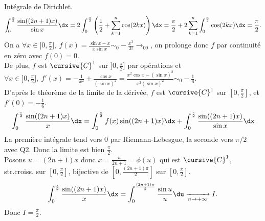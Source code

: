 \documentclass[11pt]{article}
\begin{document}
\begin{ex}{Intégrale de Dirichlet.}{}
\begin{equation*}
        \int_0^{\frac{\pi}{2}}\frac{\sin((2n+1)x)}{\sin x}\dx = 2\int_0^\frac{\pi}{2}\left( \frac{1}{2} + \sum_{k=1}^n \cos(2kx) \right) \dx = \frac{\pi}{2} + 2\sum_{k=1}^n\int_0^{\frac{\pi}{2}}\cos(2kx)\dx=\frac{\pi}{2}.
    \end{equation*}
     On a $\forall x \in ]0,\frac{\pi}{2}], ~ f(x)=\frac{\sin x - x}{x\sin x}\sim_0-\frac{x^3}{3!}\to_00$, on prolonge donc $f$ par continuité en zéro avec $f(0)=0$.\\
    De plus, $f$ est $\cursive{C}^1$ sur $]0,\frac{\pi}{2}]$ par opérations et $\forall x \in ]0,\frac{\pi}{2}], ~ f'(x)=-\frac{1}{x^2}+\frac{\cos x}{(\sin x)^2}=\frac{x^2\cos x - (\sin x)^2}{x^2(\sin x)^2} \sim_0 -\frac{1}{6}$.\\
    D'après le théorème de la limite de la dérivée, $f$ est $\cursive{C}^1$ sur $[0,\frac{\pi}{2}]$, et $f'(0)=-\frac{1}{6}$.\\
    \begin{equation*}
        \int_0^{\frac{\pi}{2}}\frac{\sin((2n+1)x)}{x}\dx = \int_0^{\frac{\pi}{2}}f(x)\sin((2n+1)x)\dx + \int_0^{\frac{\pi}{2}}\frac{\sin((2n+1)x)}{\sin x}\dx 
    \end{equation*}
    La première intégrale tend vers 0 par Riemann-Lebesgue, la seconde vers $\pi/2$ avec Q2. Donc la limite est bien $\frac{\pi}{2}$.\\
    Posons $u=(2n+1)x$ donc $x=\frac{u}{2n+1}=\phi(u)$ qui est $\cursive{C}^1$, str.croiss. sur $[0,\frac{\pi}{2}]$, bijective de $[0,\frac{(2n+1)\pi}{2}]$ sur $[0,\frac{\pi}{2}]$.
    \begin{equation*}
        \int_0^\frac{\pi}{2}\frac{\sin((2n+1)x)}{x}\dx = \int_0^{\frac{(2n+1)\pi}{2}}\frac{\sin u}{u}\du \xrightarrow[n\to+\infty]{}I.
    \end{equation*}
    Donc $I=\frac{\pi}{2}$.
\end{ex}
\end{document}
